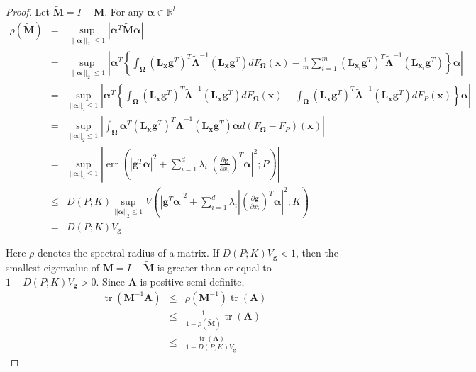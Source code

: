 \documentclass[preprint,12pt]{elsarticle}
\DeclareMathOperator{\tr}{tr} \DeclareMathOperator{\err}{err}
\begin{document}
\begin{proof}
Let $\widetilde{\boldsymbol{M}}=I-\boldsymbol{M}$. For any
$\boldsymbol{\alpha}\in\mathbb{R}^l$
\begin{eqnarray*}
\rho(\widetilde{\boldsymbol{M}}) &=&
\sup_{\|\boldsymbol{\alpha}\|_2\leq
1}\left|\boldsymbol{\alpha}^{T}\widetilde{\boldsymbol{M}}\boldsymbol{\alpha}\right|\\
&=& \sup_{\|\boldsymbol{\alpha}\|_2\leq
1}\left|\boldsymbol{\alpha}^T\left\{\int_{\boldsymbol{\Omega}}(\mathbf{L}_{\boldsymbol{x}}\boldsymbol{g}^T)^T\widetilde{\boldsymbol{\Lambda}}^{-1}(\mathbf{L}_{\boldsymbol{x}}\boldsymbol{g}^T)dF_{\boldsymbol{\Omega}}(\boldsymbol{x})-\frac{1}{m}\sum_{i=1}^m(\mathbf{L}_{\boldsymbol{x}_i}\boldsymbol{g}^T)^T\widetilde{\boldsymbol{\Lambda}}^{-1}(\mathbf{L}_{\boldsymbol{x}_i}\boldsymbol{g}^T)\right\}\boldsymbol{\alpha}\right|\\
&=& \sup_{||\boldsymbol{\alpha}||_2\leq
1}\left|\boldsymbol{\alpha}^T\left\{\int_{\boldsymbol{\Omega}}(\mathbf{L}_{\boldsymbol{x}}\boldsymbol{g}^T)^T\widetilde{\boldsymbol{\Lambda}}^{-1}(\mathbf{L}_{\boldsymbol{x}}\boldsymbol{g}^T)dF_{\boldsymbol{\Omega}}(\boldsymbol{x})-\int_{\boldsymbol{\Omega}}(\mathbf{L}_{\boldsymbol{x}}\boldsymbol{g}^T)^T\widetilde{\boldsymbol{\Lambda}}^{-1}(\mathbf{L}_{\boldsymbol{x}}\boldsymbol{g}^T)dF_P(\boldsymbol{x})\right\}\boldsymbol{\alpha}\right|\\
&=& \sup_{||\boldsymbol{\alpha}||_2\leq
1}\left|\int_{\boldsymbol{\Omega}}\boldsymbol{\alpha}^T(\mathbf{L}_{\boldsymbol{x}}\boldsymbol{g}^T)^T\widetilde{\boldsymbol{\Lambda}}^{-1}(\mathbf{L}_{\boldsymbol{x}}\boldsymbol{g}^T)\boldsymbol{\alpha}d(F_{\boldsymbol{\Omega}}-F_P)(\boldsymbol{x})\right|\\
&=& \sup_{||\boldsymbol{\alpha}||_2 \leq
1}\left|\err\left(|\boldsymbol{g}^T\boldsymbol{\alpha}|^2+\sum_{i=1}^d\lambda_i\left|\left(\frac{\partial
\boldsymbol{g}}{\partial
x_i}\right)^T\boldsymbol{\alpha}\right|^2;P\right)\right|\\
&\leq& D(P;K)\sup_{||\boldsymbol{\alpha}||_2\leq 1}
V\left(|\boldsymbol{g}^T\boldsymbol{\alpha}|^2+\sum_{i=1}^d\lambda_i\left|\left(\frac{\partial
\boldsymbol{g}}{\partial
x_i}\right)^T\boldsymbol{\alpha}\right|^2;K\right)\\
&=& D(P; K)V_{\boldsymbol{g}}
\end{eqnarray*}

Here $\rho$ denotes the spectral radius of a matrix. If
$D(P;K)V_{\boldsymbol{g}}<1$, then the smallest eigenvalue of
$\boldsymbol{M}=I-\widetilde{\boldsymbol{M}}$ is greater than or
equal to $1-D(P;K)V_{\boldsymbol{g}}>0$. Since $\boldsymbol{A}$ is
positive semi-definite,
\begin{eqnarray*}
\tr(\boldsymbol{M}^{-1}\boldsymbol{A}) &\leq&
\rho(\boldsymbol{M}^{-1})\tr(\boldsymbol{A})\\
&\leq& \frac{1}{1-\rho(\widetilde{\boldsymbol{M}})}\tr(\boldsymbol{A})\\
&\leq& \frac{\tr(\boldsymbol{A})}{1-D(P;K)V_{\boldsymbol{g}}}
\end{eqnarray*}







\end{proof}
\end{document}

